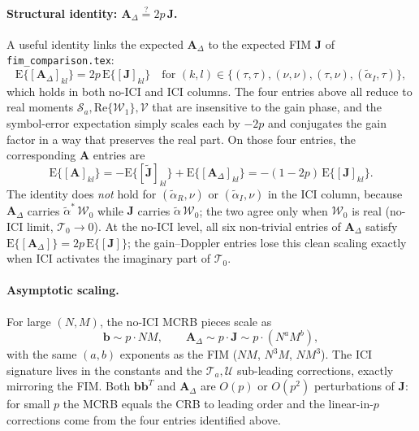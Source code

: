 \documentclass[11pt]{article}
\begin{document}
\paragraph{Structural identity: \(\bm{A}_\Delta \overset{?}{=} 2p\, \bm{J}\).} A useful identity links the expected \(\bm{A}_\Delta\) to the expected FIM \(\bm{J}\) of \texttt{fim\_comparison.tex}:
\begin{equation}
    \mathrm{E}\{[\bm{A}_\Delta]_{kl}\} = 2p\, \mathrm{E}\{[\bm{J}]_{kl}\} \quad \text{for } (k,l) \in \{(\tau,\tau), (\nu,\nu), (\tau,\nu), (\tilde{\alpha}_I, \tau)\},
\end{equation}
which holds in both no-ICI and ICI columns. The four entries above all reduce to real moments \(\mathcal{S}_a, \mathrm{Re}\{\mathcal{W}_1\}, \mathcal{V}\) that are insensitive to the gain phase, and the symbol-error expectation simply scales each by \(-2p\) and conjugates the gain factor in a way that preserves the real part. On those four entries, the corresponding \(\bm{A}\) entries are
\begin{equation}
    \mathrm{E}\{[\bm{A}]_{kl}\} = -\mathrm{E}\{[\tilde{\bm{J}}]_{kl}\} + \mathrm{E}\{[\bm{A}_\Delta]_{kl}\} = -(1 - 2p)\, \mathrm{E}\{[\bm{J}]_{kl}\}.
\end{equation}
The identity does \emph{not} hold for \((\tilde{\alpha}_R,\nu)\) or \((\tilde{\alpha}_I,\nu)\) in the ICI column, because \(\bm{A}_\Delta\) carries \(\tilde{\alpha}^*\, \mathcal{W}_0\) while \(\bm{J}\) carries \(\tilde{\alpha}\, \mathcal{W}_0\); the two agree only when \(\mathcal{W}_0\) is real (no-ICI limit, \(\mathcal{T}_0 \to 0\)). At the no-ICI level, all six non-trivial entries of \(\bm{A}_\Delta\) satisfy \(\mathrm{E}\{[\bm{A}_\Delta]\} = 2p\, \mathrm{E}\{[\bm{J}]\}\); the gain--Doppler entries lose this clean scaling exactly when ICI activates the imaginary part of \(\mathcal{T}_0\).

\paragraph{Asymptotic scaling.} For large \((N, M)\), the no-ICI MCRB pieces scale as
\begin{equation}
    \bm{b} \sim p \cdot NM, \qquad \bm{A}_\Delta \sim p \cdot \bm{J} \sim p \cdot (N^aM^b),
\end{equation}
with the same \((a,b)\) exponents as the FIM (\(NM\), \(N^3 M\), \(NM^3\)). The ICI signature lives in the constants and the \(\mathcal{T}_a, \mathcal{U}\) sub-leading corrections, exactly mirroring the FIM. Both \(\bm{b}\bm{b}^T\) and \(\bm{A}_\Delta\) are \(O(p)\) or \(O(p^2)\) perturbations of \(\bm{J}\): for small \(p\) the MCRB equals the CRB to leading order and the linear-in-\(p\) corrections come from the four entries identified above.
\end{document}
